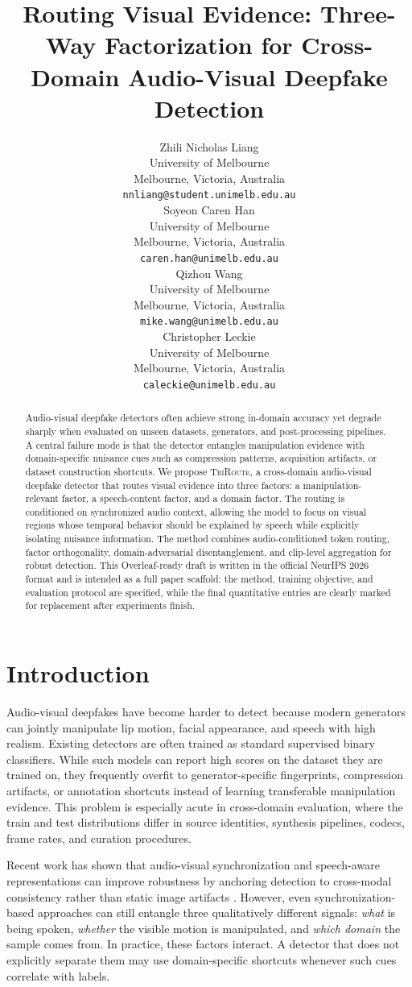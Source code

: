 \documentclass{article}
\title{Routing Visual Evidence: Three-Way Factorization for Cross-Domain Audio-Visual Deepfake Detection}
\author{%
  Zhili Nicholas Liang \\
  University of Melbourne \\
  Melbourne, Victoria, Australia \\
  \texttt{nnliang@student.unimelb.edu.au} \\
  \And
  Soyeon Caren Han \\
  University of Melbourne \\
  Melbourne, Victoria, Australia \\
  \texttt{caren.han@unimelb.edu.au} \\
  \And
  Qizhou Wang \\
  University of Melbourne \\
  Melbourne, Victoria, Australia \\
  \texttt{mike.wang@unimelb.edu.au} \\
  \And
  Christopher Leckie \\
  University of Melbourne \\
  Melbourne, Victoria, Australia \\
  \texttt{caleckie@unimelb.edu.au} \\
}
\newcommand{\method}{\textsc{TriRoute}}
\begin{document}
\maketitle

\begin{abstract}
Audio-visual deepfake detectors often achieve strong in-domain accuracy yet degrade sharply when evaluated on unseen datasets, generators, and post-processing pipelines. A central failure mode is that the detector entangles manipulation evidence with domain-specific nuisance cues such as compression patterns, acquisition artifacts, or dataset construction shortcuts. We propose \method, a cross-domain audio-visual deepfake detector that routes visual evidence into three factors: a manipulation-relevant factor, a speech-content factor, and a domain factor. The routing is conditioned on synchronized audio context, allowing the model to focus on visual regions whose temporal behavior should be explained by speech while explicitly isolating nuisance information. The method combines audio-conditioned token routing, factor orthogonality, domain-adversarial disentanglement, and clip-level aggregation for robust detection. This Overleaf-ready draft is written in the official NeurIPS 2026 format and is intended as a full paper scaffold: the method, training objective, and evaluation protocol are specified, while the final quantitative entries are clearly marked for replacement after experiments finish.
\end{abstract}

\section{Introduction}

Audio-visual deepfakes have become harder to detect because modern generators can jointly manipulate lip motion, facial appearance, and speech with high realism. Existing detectors are often trained as standard supervised binary classifiers. While such models can report high scores on the dataset they are trained on, they frequently overfit to generator-specific fingerprints, compression artifacts, or annotation shortcuts instead of learning transferable manipulation evidence. This problem is especially acute in cross-domain evaluation, where the train and test distributions differ in source identities, synthesis pipelines, codecs, frame rates, and curation procedures.

Recent work has shown that audio-visual synchronization and speech-aware representations can improve robustness by anchoring detection to cross-modal consistency rather than static image artifacts \citep{feng2023avad, liang2024speechforensics, smeu2025avhalign}. However, even synchronization-based approaches can still entangle three qualitatively different signals: \emph{what} is being spoken, \emph{whether} the visible motion is manipulated, and \emph{which domain} the sample comes from. In practice, these factors interact. A detector that does not explicitly separate them may use domain-specific shortcuts whenever such cues correlate with labels.
\end{document}

